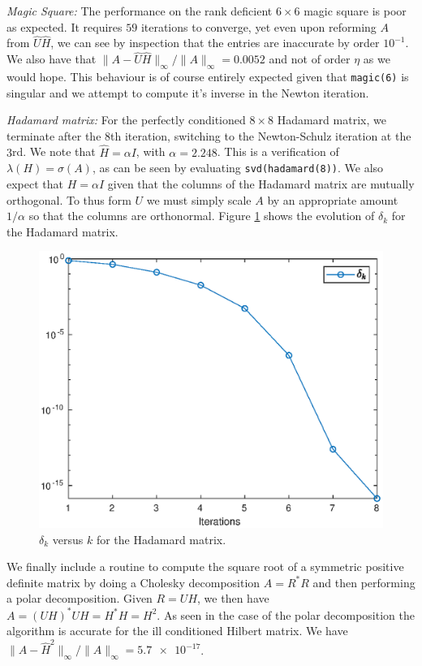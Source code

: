 \documentclass[12pt]{article}
\def\normo#1{\|#1\|_{\infty}}
\begin{document}
\textit{Magic Square:}
The performance on the rank deficient $6\times 6$ magic
square is poor as expected. It requires $59$ iterations to converge, yet even
upon reforming $A$ from $\hat{U}\hat{H}$, we can see by inspection that the
entries are inaccurate by order $10^{-1}$. We also have that
$\normo{A - \hat{U}\hat{H}}/\normo{A} = 0.0052$ and not of order $\eta$ as we
would hope. This behaviour is of course entirely expected given that
\texttt{magic(6)} is singular and we attempt to compute it's inverse in the
Newton iteration.

\textit{Hadamard matrix:} For the perfectly conditioned $8\times 8$ Hadamard
matrix, we terminate after the $8$th iteration, switching to the Newton-Schulz
iteration at the $3$rd. We note that $\hat{H} = \alpha I$, with
$\alpha = 2.248$. This is a verification of $\lambda(H) = \sigma(A)$, as can be
seen by evaluating \texttt{svd(hadamard(8))}. We also expect that
$H = \alpha I$ given that the columns of the Hadamard matrix are mutually
orthogonal. To thus form $U$ we must simply scale $A$ by an appropriate amount
$1/\alpha$ so that the columns are orthonormal. Figure \ref{fig:hadamard} shows
the evolution of $\delta_k$ for the Hadamard matrix.
\begin{figure}
  \centering
  \includegraphics[scale=0.8]{hadamard}
  \caption{$\delta_k$ versus $k$ for the Hadamard matrix.}
  \label{fig:hadamard}    
\end{figure}

We finally include a routine to compute the square root of a symmetric positive
definite matrix by doing a Cholesky decomposition $A = R^*R$ and then performing
a polar decomposition.
Given $R = UH$, we then have $A = (UH)^*UH = H^*H = H^2$.
As seen in the case of the polar decomposition the algorithm is accurate for the
ill conditioned Hilbert matrix.
We have $\normo{A - \hat{H}^2}/\normo{A} = \num{5.7e-17}$.



\end{document}
